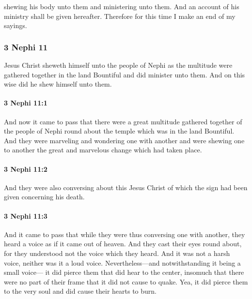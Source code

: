 			shewing his body unto them and ministering unto them.
			And an account of his ministry shall be given hereafter.
			Therefore for this time I make an end of my sayings.

	\subsubsection{3 Nephi 11} %
		\label{3NEPHI-11}
		
		Jesus Christ sheweth himself unto the people of Nephi
		as the multitude were gathered together in the land Bountiful
		and did minister unto them.
		And on this wise did he shew himself unto them.
		
		\paragraph{3 Nephi 11:1} %
			\label{3NEPHI-11-1}

			And now it came to pass that
			there were a great multitude gathered together of the people of Nephi
			round about the temple which was in the land Bountiful.
			And they were marveling and wondering one with another
			and were shewing one to another
			the great and marvelous change which had taken place.

		\paragraph{3 Nephi 11:2} %
			\label{3NEPHI-11-2}

			And they were also conversing about this Jesus Christ
			of which the sign had been given concerning his death.

		\paragraph{3 Nephi 11:3} %
			\label{3NEPHI-11-3}

			And it came to pass that while they were thus conversing one with another,
			they heard a voice as if it came out of heaven.
			And they cast their eyes round about,
			for they understood not the voice which they heard.
			And it was not a harsh voice, neither was it a loud voice.
			Nevertheless---and notwithstanding it being a small voice---
			it did pierce them that did hear to the center,
			insomuch that there were no part of their frame that it did not cause to quake.
			Yea, it did pierce them to the very soul and did cause their hearts to burn.

